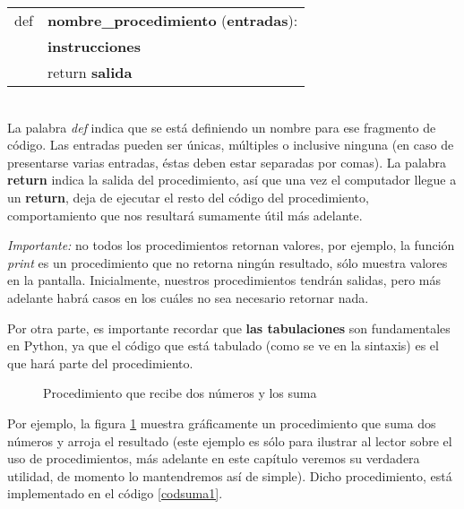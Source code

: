 \begin{tabular}{l l}
def & \textbf{nombre\_procedimiento} (\textbf{entradas}): \\
 & \textbf{instrucciones} \\
 &	return \textbf{salida} \\
\end{tabular} \\

La palabra \emph{def} indica que se está definiendo un nombre para ese fragmento de código. Las entradas pueden ser únicas, múltiples o inclusive ninguna (en caso de presentarse varias entradas, éstas deben estar separadas por comas). La palabra \textbf{return} indica la salida del procedimiento, así que una vez el computador llegue a un \textbf{return}, deja de ejecutar el resto del código del procedimiento, comportamiento que nos resultará sumamente útil más adelante. 

\emph{Importante:} no todos los procedimientos retornan valores, por ejemplo, la función \emph{print} es un procedimiento que no retorna ningún resultado, sólo muestra valores en la pantalla. Inicialmente, nuestros procedimientos tendrán salidas, pero más adelante habrá casos en los cuáles no sea necesario retornar nada.


Por otra parte, es importante recordar que \textbf{las tabulaciones} son fundamentales en Python, ya que el código que está tabulado (como se ve en la sintaxis) es el que hará parte del procedimiento.


\begin{figure}[h]
\centering
{}
\caption{Procedimiento que recibe dos números y los suma}
\label{figprocsuma}
\end{figure}

Por ejemplo, la figura \ref{figprocsuma} muestra gráficamente un procedimiento que suma dos números y arroja el resultado (este ejemplo es sólo para ilustrar al lector sobre el uso de procedimientos, más adelante en este capítulo veremos su verdadera utilidad, de momento lo mantendremos así de simple). Dicho procedimiento, está implementado en el código \ref{codsuma1}. \\

